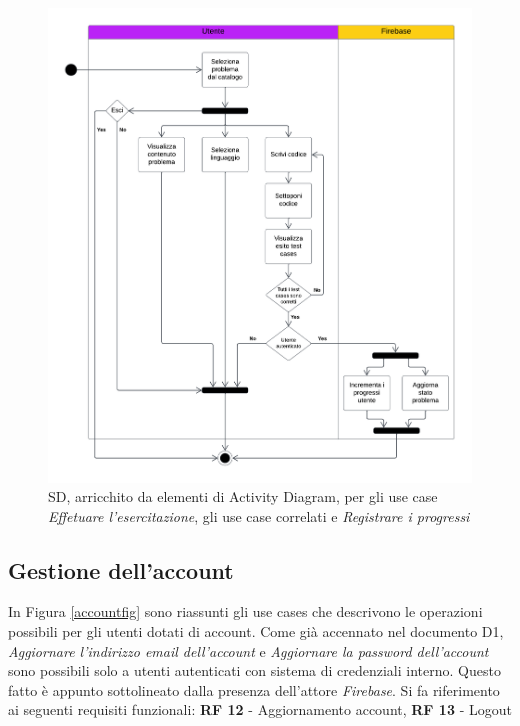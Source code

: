 \documentclass[11pt, a4paper]{article}
\theoremstyle{definition} %
\begin{document}
\begin{figure}[H]
\centering
\hspace*{-1cm}
\includegraphics[scale=0.6]{materiale/sldesercitazione.pdf}
\caption{SD, arricchito da elementi di Activity Diagram,
per gli use case \textit{Effetuare l'esercitazione}, gli use case correlati
e \textit{Registrare i progressi}}
\label{acexercise}
\end{figure}


\newpage
\subsection{Gestione dell'account}
In Figura \ref{accountfig} sono riassunti gli use cases che descrivono
le operazioni possibili per gli utenti dotati di account. Come già accennato
nel documento D1, \textit{Aggiornare l'indirizzo email dell'account} e
\textit{Aggiornare la password dell'account} sono possibili solo a utenti
autenticati con sistema di credenziali interno. Questo fatto è appunto
sottolineato dalla presenza dell'attore \textit{Firebase}. Si fa riferimento
ai seguenti requisiti funzionali:
\textbf{RF 12} - Aggiornamento account, \textbf{RF 13} - Logout
\end{document}
